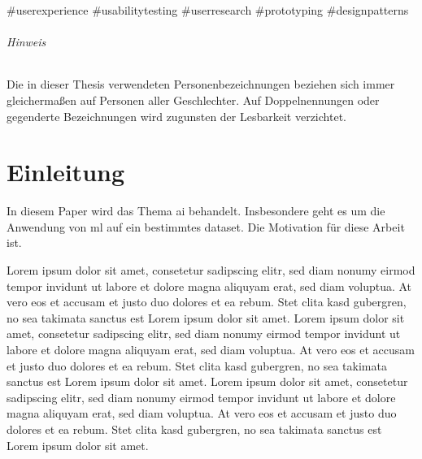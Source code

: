 \documentclass[9pt,a4paper,ngerman]{extarticle}
\begin{document}
\#userexperience\break 
\#usabilitytesting\break
\#userresearch\break
\#prototyping\break
\#designpatterns\break

\clearpage

\tableofcontents

\vfill
\paragraph{Hinweis}
Die in dieser Thesis verwendeten Personenbezeichnungen beziehen sich immer gleichermaßen auf Personen aller Geschlechter. Auf Doppelnennungen oder gegenderte Bezeichnungen wird zugunsten der Lesbarkeit verzichtet.

\clearpage

\part{Einleitung}\label{sec:einleitung}
In diesem Paper wird das Thema \gls{ai} behandelt. Insbesondere geht es um die Anwendung von \gls{ml} auf ein bestimmtes \gls{dataset}. Die Motivation für diese Arbeit ist. 

Lorem ipsum dolor sit amet, consetetur sadipscing elitr, sed diam nonumy eirmod tempor invidunt ut labore et dolore magna aliquyam erat, sed diam voluptua. At vero eos et accusam et justo duo dolores et ea rebum. Stet clita kasd gubergren, no sea takimata sanctus est Lorem ipsum dolor sit amet. Lorem ipsum dolor sit amet, consetetur sadipscing elitr, sed diam nonumy eirmod tempor invidunt ut labore et dolore magna aliquyam erat, sed diam voluptua. At vero eos et accusam et justo duo dolores et ea rebum. Stet clita kasd gubergren, no sea takimata sanctus est Lorem ipsum dolor sit amet. Lorem ipsum dolor sit amet, consetetur sadipscing elitr, sed diam nonumy eirmod tempor invidunt ut labore et dolore magna aliquyam erat, sed diam voluptua. At vero eos et accusam et justo duo dolores et ea rebum. Stet clita kasd gubergren, no sea takimata sanctus est Lorem ipsum dolor sit amet.   

\clearpage

\end{document}

